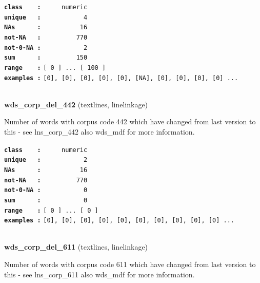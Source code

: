\documentclass[]{article}
\begin{document}
\textbf{\texttt{class\ \ \ \ :}} \texttt{~~~~~numeric}\\
\textbf{\texttt{unique\ \ \ :}} \texttt{~~~~~~~~~~~4}\\
\textbf{\texttt{NAs\ \ \ \ \ \ :}} \texttt{~~~~~~~~~~16}\\
\textbf{\texttt{not-NA\ \ \ :}} \texttt{~~~~~~~~~770}\\
\textbf{\texttt{not-0-NA\ :}} \texttt{~~~~~~~~~~~2}\\
\textbf{\texttt{sum\ \ \ \ \ \ :}} \texttt{~~~~~~~~~150}\\
\textbf{\texttt{range\ \ \ \ :}}
\texttt{{[}\ 0\ {]}\ ...\ {[}\ 100\ {]}}\\
\textbf{\texttt{examples\ :}}
\texttt{{[}0{]},\ {[}0{]},\ {[}0{]},\ {[}0{]},\ {[}0{]},\ {[}NA{]},\ {[}0{]},\ {[}0{]},\ {[}0{]},\ {[}0{]}\ ...}\\

~

\textbf{wds\_corp\_del\_442} (textlines, linelinkage)

Number of words with corpus code 442 which have changed from last
version to this - see lns\_corp\_442 also wds\_mdf for more information.

\textbf{\texttt{class\ \ \ \ :}} \texttt{~~~~~numeric}\\
\textbf{\texttt{unique\ \ \ :}} \texttt{~~~~~~~~~~~2}\\
\textbf{\texttt{NAs\ \ \ \ \ \ :}} \texttt{~~~~~~~~~~16}\\
\textbf{\texttt{not-NA\ \ \ :}} \texttt{~~~~~~~~~770}\\
\textbf{\texttt{not-0-NA\ :}} \texttt{~~~~~~~~~~~0}\\
\textbf{\texttt{sum\ \ \ \ \ \ :}} \texttt{~~~~~~~~~~~0}\\
\textbf{\texttt{range\ \ \ \ :}}
\texttt{{[}\ 0\ {]}\ ...\ {[}\ 0\ {]}}\\
\textbf{\texttt{examples\ :}}
\texttt{{[}0{]},\ {[}0{]},\ {[}0{]},\ {[}0{]},\ {[}0{]},\ {[}0{]},\ {[}0{]},\ {[}0{]},\ {[}0{]},\ {[}0{]}\ ...}\\

~

\textbf{wds\_corp\_del\_611} (textlines, linelinkage)

Number of words with corpus code 611 which have changed from last
version to this - see lns\_corp\_611 also wds\_mdf for more information.
\end{document}
